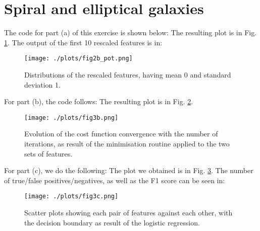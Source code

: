 \section{Spiral and elliptical galaxies}
The code for part (a) of this exercise is shown below: 
The resulting plot is in Fig. \ref{fig:fig3a}.
The output of the first 10 rescaled features is in: 

\begin{figure}[h!]
  \centering
  \texttt{[image: ./plots/fig2b\_pot.png]}
  \caption{Distributions of the rescaled features, having mean 0 and standard deviation 1.} 
  \label{fig:fig3a}
\end{figure}

For part (b), the code follows: 
The resulting plot is in Fig. \ref{fig:fig3b}.

\begin{figure}[h!]
  \centering
  \texttt{[image: ./plots/fig3b.png]}
  \caption{Evolution of the cost function convergence with the number of iterations, as result of the minimisation routine applied to the two sets of features.} 
  \label{fig:fig3b}
\end{figure}

For part (c), we do the following: 
The plot we obtained is in Fig. \ref{fig:fig3c}.
The number of true/false positives/negatives, as well as the F1 score can be seen in: 

\begin{figure}[h!]
  \centering
  \texttt{[image: ./plots/fig3c.png]}
  \caption{Scatter plots showing each pair of features against each other, with the decision boundary as result of the logistic regression.} 
  \label{fig:fig3c}
\end{figure}


